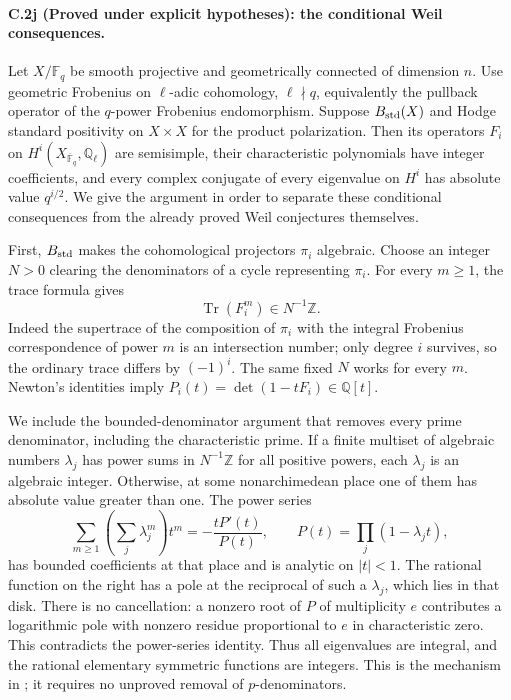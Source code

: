 \paragraph{C.2j (Proved under explicit hypotheses): the conditional Weil consequences.}
Let $X/\mathbb F_q$ be smooth projective and geometrically connected
of dimension $n$. Use geometric Frobenius on $\ell$-adic cohomology,
$\ell\nmid q$, equivalently the pullback operator of the $q$-power
Frobenius endomorphism. Suppose $B_{\rm std}(X)$ and Hodge standard
positivity on $X\times X$ for the product polarization. Then its
operators $F_i$ on $H^i(X_{\overline{\mathbb F}_q},\mathbb Q_\ell)$
are semisimple, their characteristic polynomials have integer
coefficients, and every complex conjugate of every eigenvalue on
$H^i$ has absolute value $q^{i/2}$. We give the argument in order to
separate these conditional consequences from the already proved
Weil conjectures themselves.

First, $B_{\rm std}$ makes the cohomological projectors $\pi_i$
algebraic. Choose an integer $N>0$ clearing the denominators of a
cycle representing $\pi_i$. For every $m\ge1$, the trace formula gives
\[
             \operatorname{Tr}(F_i^m)\in N^{-1}\mathbb Z.
\]
Indeed the supertrace of the composition of $\pi_i$ with the integral
Frobenius correspondence of power $m$ is an intersection number;
only degree $i$ survives, so the ordinary trace differs by $(-1)^i$.
The same fixed $N$ works for every $m$. Newton's identities imply
$P_i(t)=\det(1-tF_i)\in\mathbb Q[t]$.

We include the bounded-denominator argument that removes every
prime denominator, including the characteristic prime. If a finite
multiset of algebraic numbers $\lambda_j$ has power sums in
$N^{-1}\mathbb Z$ for all positive powers, each $\lambda_j$ is an
algebraic integer. Otherwise, at some nonarchimedean place one of
them has absolute value greater than one. The power series
\[
 \sum_{m\ge1}\left(\sum_j\lambda_j^m\right)t^m
       =-\frac{tP'(t)}{P(t)},
 \qquad P(t)=\prod_j(1-\lambda_jt),
\]
has bounded coefficients at that place and is analytic on $|t|<1$.
The rational function on the right has a pole at the reciprocal
of such a $\lambda_j$, which lies in that disk. There is no cancellation:
a nonzero root of $P$ of multiplicity $e$ contributes a logarithmic
pole with nonzero residue proportional to $e$ in characteristic zero.
This contradicts the power-series identity. Thus all eigenvalues are
integral, and the rational elementary symmetric functions are integers.
This is the mechanism in \citet[Proposition 2.6]{cyKleiman1968}; it
requires no unproved removal of $p$-denominators.

